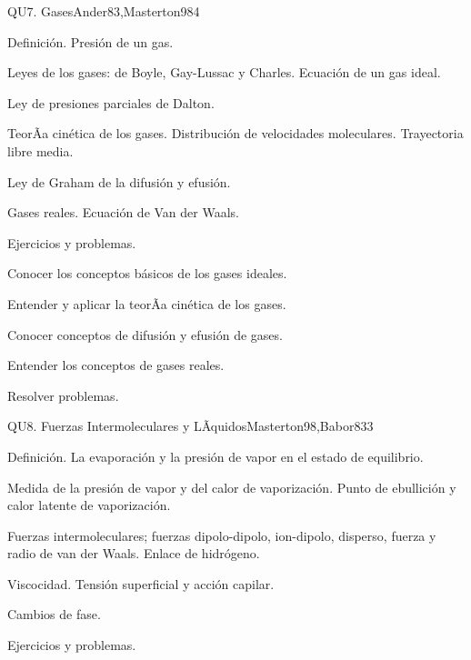 \begin{syllabus}
\begin{unit}{QU7. Gases}{Ander83,Masterton98}{4}
\begin{topics}
      \item Definición. Presión de un gas.
      \item Leyes de los gases: de Boyle, Gay-Lussac y Charles. Ecuación de un gas ideal.
      \item Ley de presiones parciales de Dalton.
      \item TeorÃ­a cinética de los gases. Distribución de velocidades moleculares. Trayectoria libre media.
      \item Ley de Graham de la difusión y efusión.
      \item Gases reales. Ecuación de Van der Waals.
      \item Ejercicios y problemas.
   \end{topics}

   \begin{unitgoals}
      \item Conocer los conceptos básicos de los gases ideales.
      \item Entender y aplicar la teorÃ­a cinética de los gases.
      \item Conocer conceptos de difusión y efusión de gases.
      \item Entender los conceptos de gases reales.
      \item Resolver problemas.
   \end{unitgoals}
\end{unit}

\begin{unit}{QU8. Fuerzas Intermoleculares y LÃ­quidos}{Masterton98,Babor83}{3}
\begin{topics}
      \item Definición. La evaporación y la presión de vapor en el estado de equilibrio.
      \item Medida de la presión de vapor y del calor de vaporización. Punto de ebullición y calor latente de vaporización.
      \item Fuerzas intermoleculares; fuerzas dipolo-dipolo, ion-dipolo, disperso, fuerza y radio de van der Waals. Enlace de hidrógeno.
      \item Viscocidad. Tensión superficial y acción capilar.
      \item Cambios de fase.
      \item Ejercicios y problemas.
    \end{topics}


\end{unit}
\end{syllabus}
